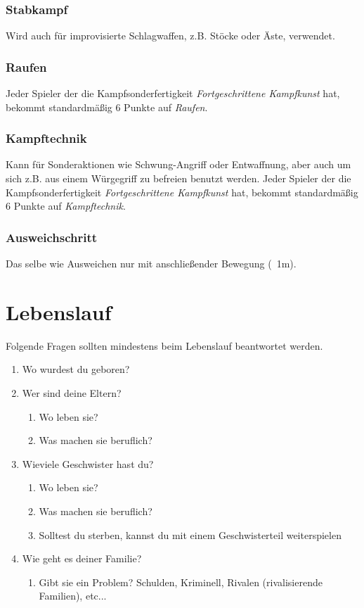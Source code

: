 \subsubsection{Stabkampf}
Wird auch für improvisierte Schlagwaffen, z.B. Stöcke oder Äste, verwendet.

\subsubsection{Raufen}
Jeder Spieler der die Kampfsonderfertigkeit \textit{Fortgeschrittene Kampfkunst} hat, bekommt standardmäßig 6 Punkte auf \textit{Raufen}.

\subsubsection{Kampftechnik}
Kann für Sonderaktionen wie Schwung-Angriff oder Entwaffnung, aber auch um sich z.B. aus einem Würgegriff zu befreien benutzt werden. Jeder Spieler der die Kampfsonderfertigkeit \textit{Fortgeschrittene Kampfkunst} hat, bekommt standardmäßig 6 Punkte auf \textit{Kampftechnik}.

\subsubsection{Ausweichschritt}
Das selbe wie Ausweichen nur mit anschließender Bewegung (~1m).


\section{Lebenslauf}
Folgende Fragen sollten mindestens beim Lebenslauf beantwortet werden.

\begin{enumerate}
\item Wo wurdest du geboren?
\item Wer sind deine Eltern?
	\begin{enumerate}[label=2.\arabic*.]
	\item Wo leben sie?
	\item Was machen sie beruflich?
	\end{enumerate}

\item Wieviele Geschwister hast du?
	\begin{enumerate}[label=3.\arabic*.]
	\item Wo leben sie?
	\item Was machen sie beruflich?
	\item Solltest du sterben, kannst du mit einem Geschwisterteil weiterspielen
	\end{enumerate}

\item Wie geht es deiner Familie?
	\begin{enumerate}[label=4.\arabic*.]
	\item Gibt sie ein Problem? Schulden, Kriminell, Rivalen (rivalisierende Familien), etc...
	\end{enumerate}

\end{enumerate}
